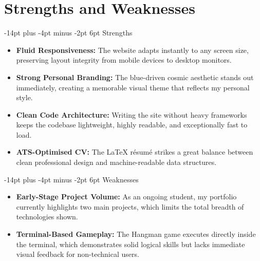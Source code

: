 \documentclass[12pt, a4paper]{report}
\makeatletter
\renewcommand\section{%
  \@startsection{section}{1}{\z@}%
    {-14pt plus -4pt minus -2pt}%
    {6pt}%
    {\normalfont\fontsize{14}{18}\bfseries\color{midPurple}}%
}
\makeatother
\begin{document}
\chapter{Strengths and Weaknesses}

\section{Strengths}

\begin{itemize}
  \item \textbf{Fluid Responsiveness:} The website adapts instantly to any
        screen size, preserving layout integrity from mobile devices to
        desktop monitors.

  \item \textbf{Strong Personal Branding:} The blue-driven cosmic aesthetic
        stands out immediately, creating a memorable visual theme that
        reflects my personal style.

  \item \textbf{Clean Code Architecture:} Writing the site without heavy
        frameworks keeps the codebase lightweight, highly readable, and
        exceptionally fast to load.

  \item \textbf{ATS-Optimised CV:} The LaTeX r\'{e}sum\'{e} strikes a
        great balance between clean professional design and machine-readable
        data structures.
\end{itemize}

\section{Weaknesses}

\begin{itemize}
  \item \textbf{Early-Stage Project Volume:} As an ongoing student, my
        portfolio currently highlights two main projects, which limits the
        total breadth of technologies shown.

  \item \textbf{Terminal-Based Gameplay:} The Hangman game executes directly
        inside the terminal, which demonstrates solid logical skills but lacks
        immediate visual feedback for non-technical users.
\end{itemize}
\end{document}
